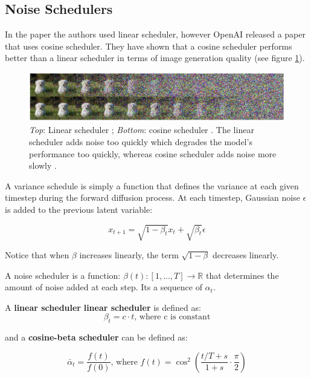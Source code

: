 





\subsection{Noise Schedulers}

In the paper \cite{ddpm} the authors used linear scheduler, however OpenAI released a paper \cite{openai_improved_ddpm} that uses cosine scheduler. They have shown that a cosine scheduler performs better than a linear scheduler in terms of image generation quality (see figure \ref{fig:linear_cosine_scheduler}).

\begin{figure}
    \centering
    \includegraphics[width=1\textwidth]{images/diffusion_models/linear_cosine_scheduler.png}
    \caption{\textit{Top}: Linear scheduler \cite{ddpm}; \textit{Bottom}: cosine scheduler \cite{openai_improved_ddpm}. The linear scheduler adds noise too quickly which degrades the model's performance too quickly, whereas cosine scheduler adds noise more slowly \cite{openai_improved_ddpm}.}
    \label{fig:linear_cosine_scheduler}
\end{figure}

A variance schedule is simply a function that defines the variance at each given timestep during the forward diffusion process. At each timestep, Gaussian noise $\epsilon$ is added to the previous latent variable:

\[
    x_{t+1} = \sqrt{1 - \beta_t} x_t + \sqrt{\beta_t} \epsilon
\]

Notice that when $\beta$ increases linearly, the term $\sqrt{1-\beta}$ decreases linearly. 

A noise scheduler is a function: $\beta(t):[1, ..., T] \rightarrow \mathbb{R}$ that determines the amount of noise added at each step. Its a sequence of $\alpha_t$.

A \textbf{linear scheduler} \textbf{linear scheduler} is defined as:
\[
    \beta_t = c \cdot t \text{, where c is constant}
\]

and a \textbf{cosine-beta scheduler} can be defined as:

\[
    \bar{\alpha}_t = \frac{f(t)}{f(0)} \text{, where } f(t) = \cos^2 \left( \frac{t/T + s}{1+s} \cdot \frac{\pi}{2} \right)
\]








